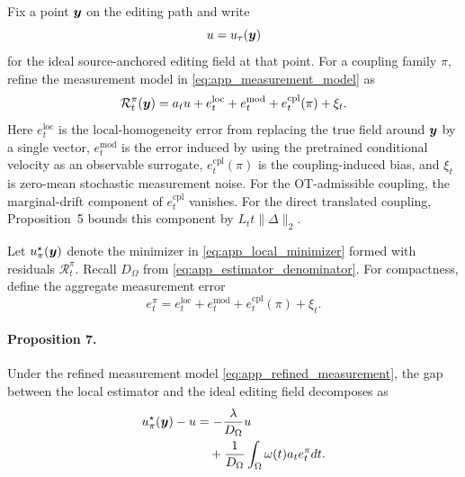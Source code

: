 Fix a point $\boldsymbol{y}$ on the editing path and write
\begin{equation}
    \label{eq:app_ideal_local_u}
    u=u_\tau(\boldsymbol{y})
\end{equation}
for the ideal source-anchored editing field at that point.
For a coupling family $\pi$, refine the measurement model in \eqref{eq:app_measurement_model} as
\begin{equation}
    \label{eq:app_refined_measurement}
    \mathcal{R}^{\pi}_t(\boldsymbol{y})
    =
    a_tu
    +
    e_t^{\mathrm{loc}}
    +
    e_t^{\mathrm{mod}}
    +
    e_t^{\mathrm{cpl}}(\pi)
    +
    \xi_t.
\end{equation}
Here $e_t^{\mathrm{loc}}$ is the local-homogeneity error from replacing the true field around $\boldsymbol{y}$ by a single vector, $e_t^{\mathrm{mod}}$ is the error induced by using the pretrained conditional velocity as an observable surrogate, $e_t^{\mathrm{cpl}}(\pi)$ is the coupling-induced bias, and $\xi_t$ is zero-mean stochastic measurement noise.
For the OT-admissible coupling, the marginal-drift component of $e_t^{\mathrm{cpl}}$ vanishes.
For the direct translated coupling, Proposition~5 bounds this component by $L_t t\|\Delta\|_2$.

Let $u_\pi^\star(\boldsymbol{y})$ denote the minimizer in \eqref{eq:app_local_minimizer} formed with residuals $\mathcal{R}^{\pi}_t$.
Recall $D_\Omega$ from \eqref{eq:app_estimator_denominator}.
For compactness, define the aggregate measurement error
\begin{equation}
    \label{eq:app_aggregate_error}
    e_t^\pi
    =
    e_t^{\mathrm{loc}}
    +
    e_t^{\mathrm{mod}}
    +
    e_t^{\mathrm{cpl}}(\pi)
    +
    \xi_t.
\end{equation}

\paragraph{Proposition 7.}
Under the refined measurement model \eqref{eq:app_refined_measurement}, the gap between the local estimator and the ideal editing field decomposes as
\begin{equation}
    \label{eq:app_gap_decomposition}
    \begin{aligned}
    u_\pi^\star(\boldsymbol{y})-u
    &=
    -\frac{\lambda}{D_\Omega}u
    \\
    &\quad+
    \frac{1}{D_\Omega}
    \int_\Omega
    \omega(t)a_t
    e_t^\pi dt.
    \end{aligned}
\end{equation}

